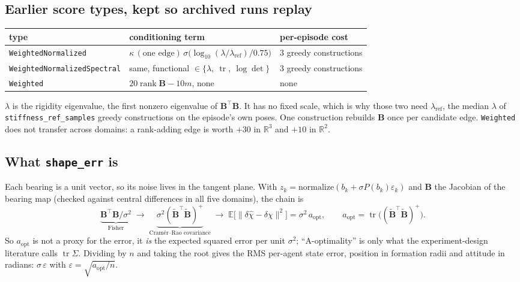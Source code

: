 \documentclass[11pt,a4paper]{article}
\newcommand{\R}{\mathbb{R}}
\newcommand{\rk}{\operatorname{rank}}
\newcommand{\B}{\mathbf{B}}
\newcommand{\Bs}{\widetilde{\mathbf{B}}}
\begin{document}
\subsection*{Earlier score types, kept so archived runs replay}
\begin{center}
\begin{tabular}{lll}
\toprule
type & conditioning term & per-episode cost \\
\midrule
\texttt{WeightedNormalized} & $\kappa\,(\text{one edge})\,\sigma\!\big(\log_{10}(\lambda/\lambda_{\text{ref}})/0.75\big)$ & 3 greedy constructions \\
\texttt{WeightedNormalizedSpectral} & same, functional $\in\{\lambda,\ \operatorname{tr},\ \log\det\}$ & 3 greedy constructions \\
\texttt{Weighted} & $20\rk\B-10m$, none & none \\
\bottomrule
\end{tabular}
\end{center}
$\lambda$ is the rigidity eigenvalue, the first nonzero eigenvalue of $\B^{\!\top}\B$. It has
no fixed scale, which is why those two need $\lambda_{\text{ref}}$, the median $\lambda$ of
\texttt{stiffness\_ref\_samples} greedy constructions on the episode's own poses. One
construction rebuilds $\B$ once per candidate edge. \texttt{Weighted} does not transfer
across domains: a rank-adding edge is worth $+30$ in $\R^3$ and $+10$ in $\R^2$.

\subsection{What \texttt{shape\_err} is}
\label{sec:shape}

Each bearing is a unit vector, so its noise lives in the tangent plane. With
$z_k=\text{normalize}(b_k+\sigma P(b_k)\varepsilon_k)$ and $\B$ the Jacobian of the
bearing map (checked against central differences in all five domains), the chain is
\[
\underbrace{\B^{\!\top}\B/\sigma^2}_{\text{Fisher}}
\;\longrightarrow\;
\underbrace{\sigma^2(\Bs^{\!\top}\Bs)^{+}}_{\text{Cram\'er--Rao covariance}}
\;\longrightarrow\;
\mathbb E\big[\|\delta\hat\chi-\delta\chi\|^2\big]=\sigma^2\,a_{\text{opt}},
\qquad a_{\text{opt}}=\operatorname{tr}\big((\Bs^{\!\top}\Bs)^{+}\big).
\]
So $a_{\text{opt}}$ is not a proxy for the error, it \emph{is} the expected squared error
per unit $\sigma^2$; ``A-optimality'' is only what the experiment-design literature calls
$\operatorname{tr}\Sigma$. Dividing by $n$ and taking the root gives the RMS per-agent
state error, position in formation radii and attitude in radians:
$\sigma\,\varepsilon$ with $\varepsilon=\sqrt{a_{\text{opt}}/n}$.
\end{document}
